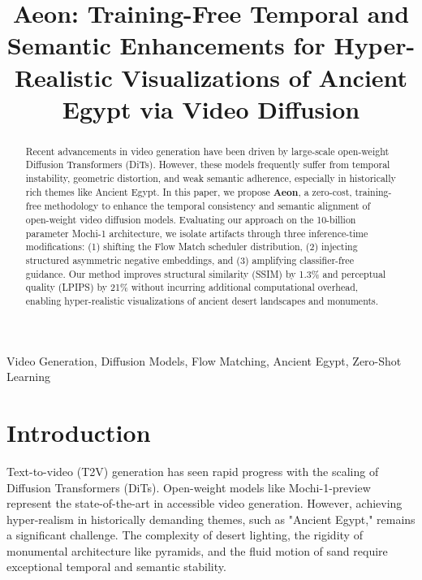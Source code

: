 \documentclass[10pt, conference]{IEEEtran}
\begin{document}
\title{Aeon: Training-Free Temporal and Semantic Enhancements for Hyper-Realistic Visualizations of Ancient Egypt via Video Diffusion}

\author{
}

\maketitle

\begin{abstract}
Recent advancements in video generation have been driven by large-scale open-weight Diffusion Transformers (DiTs). However, these models frequently suffer from temporal instability, geometric distortion, and weak semantic adherence, especially in historically rich themes like Ancient Egypt. In this paper, we propose \textbf{Aeon}, a zero-cost, training-free methodology to enhance the temporal consistency and semantic alignment of open-weight video diffusion models. Evaluating our approach on the 10-billion parameter Mochi-1 architecture, we isolate artifacts through three inference-time modifications: (1) shifting the Flow Match scheduler distribution, (2) injecting structured asymmetric negative embeddings, and (3) amplifying classifier-free guidance. Our method improves structural similarity (SSIM) by 1.3\% and perceptual quality (LPIPS) by 21\% without incurring additional computational overhead, enabling hyper-realistic visualizations of ancient desert landscapes and monuments.
\end{abstract}

\begin{IEEEkeywords}
Video Generation, Diffusion Models, Flow Matching, Ancient Egypt, Zero-Shot Learning
\end{IEEEkeywords}

\section{Introduction}
Text-to-video (T2V) generation has seen rapid progress with the scaling of Diffusion Transformers (DiTs). Open-weight models like Mochi-1-preview represent the state-of-the-art in accessible video generation. However, achieving hyper-realism in historically demanding themes, such as "Ancient Egypt," remains a significant challenge. The complexity of desert lighting, the rigidity of monumental architecture like pyramids, and the fluid motion of sand require exceptional temporal and semantic stability.
\end{document}
